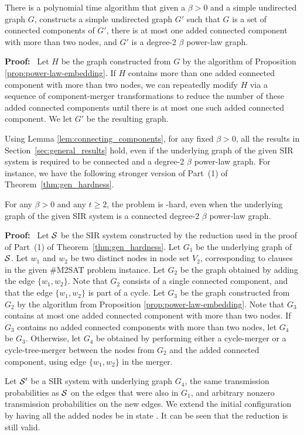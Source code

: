 \begin{lemma}  \label{lem:connecting_components}
There is a polynomial time algorithm that given a $\beta >0$ and a
simple undirected graph $G$, constructs a simple undirected graph
$G'$ such that $G$ is a set of connected components of $G'$, there
is at most one added connected component with more than two nodes,
and $G'$ is a degree-2 $\beta$  power-law graph.
\end{lemma}   

\noindent
\textbf{Proof:}~  
Let $H$ be the graph constructed from $G$ by the algorithm of
Proposition \ref{prop:power-law-embedding}.  If $H$ contains more
than one added connected component with more than two nodes, we can
repeatedly modify $H$ via a sequence of component-merger transformations
to reduce the number of these added connected components until there
is at most one such added connected component.  We let $G'$ be the
resulting graph.  \QED

Using Lemma \ref{lem:connecting_components}, 
for any fixed $\beta > 0$, all the results 
in Section~\ref{sec:general_results} hold, even if the underlying
graph of the given SIR system is required to be connected and a
degree-2 $\beta$  power-law graph.  For instance, we have the
following stronger version of Part~(1) of Theorem~\ref{thm:gen_hardness}.


\begin{theorem}\label{thm:hardness_degree_power_law}
For any $\beta > 0$ and any $t \geq 2$, the \tNewInfv{} problem is
\cnump-hard, even when the underlying graph of the given SIR system
is a connected degree-2 $\beta$  power-law graph.
\end{theorem}

\noindent
\textbf{Proof:}~  
Let $\mbox{${\cal S}$}{}$ be the SIR system constructed by the reduction used
in the proof of Part~(1) of Theorem~\ref{thm:gen_hardness}.  
Let $G_1$ be the underlying graph
of $\mbox{${\cal S}$}{}$.  Let $w_1$ and $w_2$ be two distinct nodes in node
set $V_2$, corresponding to clauses in the given \#M2SAT problem
instance.  Let $G_2$ be the graph obtained by adding the edge $\{w_1,
w_2\}$.  Note that $G_2$ consists of a single connected component,
and that the edge $\{w_1, w_2\}$ is part of a cycle.  Let $G_3$ be
the graph constructed from $G_2$ by the algorithm from Proposition
\ref{prop:power-law-embedding}.  Note that $G_3$ contains at most
one added connected component with more than two nodes.  If $G_3$
contains no added connected components with more than two nodes,
let $G_4$ be $G_3$.  Otherwise, let $G_4$ be obtained by 
performing either a cycle-merger or a cycle-tree-merger between the
nodes from $G_2$ and the added connected component, using edge
$\{w_1, w_2\}$ in the merger.

Let $\mbox{$\mathcal{S}'$}{}$ be a SIR system with underlying graph $G_4$, the
same transmission probabilities as $\mbox{${\cal S}$}{}$ on the edges that were
also in $G_1$, and arbitrary nonzero transmission probabilities on
the new edges.  We extend the initial configuration by having all
the added nodes be in state \sstate.  It can be seen that the
reduction is still valid.  \QED
